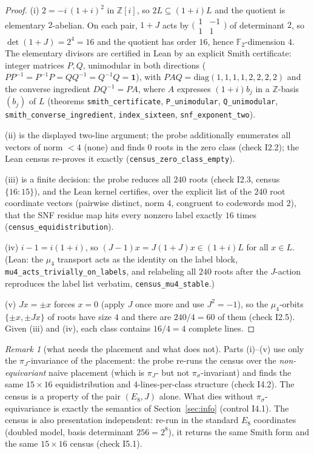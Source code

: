 \documentclass[11pt,a4paper]{article}
\theoremstyle{remark}
\newtheorem{remark}[theorem]{Remark}
\newcommand{\F}{\mathbb F}
\newcommand{\Z}{\mathbb Z}
\begin{document}
\begin{proof}
(i) $2=-i\,(1+i)^2$ in $\Z[i]$, so $2L\subseteq(1+i)L$ and the
quotient is elementary $2$-abelian.  On each pair, $1+J$ acts by
$\bigl(\begin{smallmatrix}1&-1\\1&1\end{smallmatrix}\bigr)$ of
determinant $2$, so $\det(1+J)=2^4=16$ and the quotient has order
$16$, hence $\F_2$-dimension $4$.  The elementary divisors are
certified in Lean by an explicit Smith certificate: integer matrices
$P,Q$, unimodular in both directions
($PP^{-1}=P^{-1}P=QQ^{-1}=Q^{-1}Q=\mathbf 1$), with
$PAQ=\mathrm{diag}(1,1,1,1,2,2,2,2)$ and the converse ingredient
$DQ^{-1}=PA$, where $A$ expresses $(1+i)b_j$ in a $\Z$-basis
$(b_j)$ of $L$ (theorems \texttt{smith\_certificate},
\texttt{P\_unimodular}, \texttt{Q\_unimodular},
\texttt{smith\_converse\_ingredient}, \texttt{index\_sixteen},
\texttt{snf\_exponent\_two}).

(ii) is the displayed two-line argument; the probe additionally
enumerates all vectors of norm $<4$ (none) and finds $0$ roots in the
zero class (check I2.2); the Lean census re-proves it exactly
(\texttt{census\_zero\_class\_empty}).

(iii) is a finite decision: the probe reduces all $240$ roots
(check I2.3, census $\{16\colon15\}$), and the Lean kernel certifies,
over the explicit list of the $240$ root coordinate vectors (pairwise
distinct, norm $4$, congruent to codewords mod $2$), that the SNF
residue map hits every nonzero label exactly $16$ times
(\texttt{census\_equidistribution}).

(iv) $i-1=i(1+i)$, so $(J-1)x=J(1+J)x\in(1+i)L$ for all $x\in L$.
(Lean: the $\mu_4$ transport acts as the identity on the label block,
\texttt{mu4\_acts\_trivially\_on\_labels}, and relabeling all $240$
roots after the $J$-action reproduces the label list verbatim,
\texttt{census\_mu4\_stable}.)

(v) $Jx=\pm x$ forces $x=0$ (apply $J$ once more and use $J^2=-1$),
so the $\mu_4$-orbits $\{\pm x,\pm Jx\}$ of roots have size $4$ and
there are $240/4=60$ of them (check I2.5).  Given (iii) and (iv),
each class contains $16/4=4$ complete lines.
\end{proof}

\begin{remark}[what needs the placement and what does not]
\label{rem:placement}
Parts (i)--(v) use only the $\pi_J$-invariance of the placement: the
probe re-runs the census over the \emph{non-equivariant} naive
placement (which is $\pi_J$- but not $\pi_\sigma$-invariant) and
finds the same $15\times16$ equidistribution and $4$-lines-per-class
structure (check I4.2).  The census is a property of the pair
$(E_8,J)$ alone.  What dies without $\pi_\sigma$-equivariance is
exactly the semantics of Section~\ref{sec:info} (control I4.1).  The
census is also presentation independent: re-run in the standard
$E_8$ coordinates (doubled model, basis determinant $256=2^8$), it
returns the same Smith form and the same $15\times16$ census
(check I5.1).
\end{remark}
\end{document}
